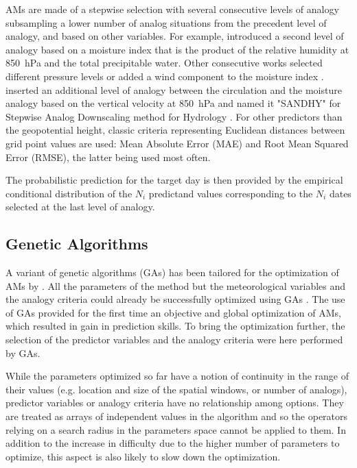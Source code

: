 \documentclass[draft]{agujournal2019}
\begin{document}
AMs are made of a stepwise selection with several consecutive levels of analogy subsampling a lower number of analog situations from the precedent level of analogy, and based on other variables. For example,  introduced a second level of analogy based on a moisture index that is the product of the relative humidity at 850~hPa and the total precipitable water. Other consecutive works selected different pressure levels or added a wind component to the moisture index \cite{Marty2010, Horton2018a}.  inserted an additional level of analogy between the circulation and the moisture analogy based on the vertical velocity at 850~hPa and named it "SANDHY" for Stepwise Analog Downscaling method for Hydrology \cite{BenDaoud2016, Caillouet2016}. For other predictors than the geopotential height, classic criteria representing Euclidean distances between grid point values are used: Mean Absolute Error (MAE) and Root Mean Squared Error (RMSE), the latter being used most often.

The probabilistic prediction for the target day is then provided by the empirical conditional distribution of the $N_{i}$ predictand values corresponding to the $N_{i}$ dates selected at the last level of analogy.


\subsection{Genetic Algorithms}
\label{gas}

A variant of genetic algorithms (GAs) has been tailored for the optimization of AMs by . All the parameters of the method but the meteorological variables and the analogy criteria could already be successfully optimized using GAs \cite{Horton2018a}. The use of GAs provided for the first time an objective and global optimization of AMs, which resulted in gain in prediction skills. To bring the optimization further, the selection of the predictor variables and the analogy criteria were here performed by GAs. 

While the parameters optimized so far have a notion of continuity in the range of their values (e.g. location and size of the spatial windows, or number of analogs), predictor variables or analogy criteria have no relationship among options. They are treated as arrays of independent values in the algorithm and so the operators relying on a search radius in the parameters space \cite{Horton2017a} cannot be applied to them. In addition to the increase in difficulty due to the higher number of parameters to optimize, this aspect is also likely to slow down the optimization.
\end{document}
